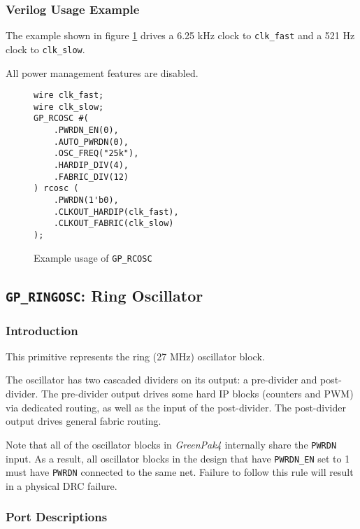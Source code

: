 \documentclass[11pt]{article}
\newcommand{\namestyle}[1]{\textit{#1}}
\newcommand{\tokenstyle}[1]{\texttt{#1}}
\newcommand{\wirestyle}[1]{\texttt{#1}}
\begin{document}
\pagebreak
\subsubsection{Verilog Usage Example}

The example shown in figure \ref{gp-rcosc-example} drives a 6.25 kHz clock to \wirestyle{clk\_fast} and a 521 Hz clock to
\wirestyle{clk\_slow}.

All power management features are disabled.

\begin{figure}[h]
\begin{lstlisting}
wire clk_fast;
wire clk_slow;
GP_RCOSC #(
	.PWRDN_EN(0),
	.AUTO_PWRDN(0),
	.OSC_FREQ("25k"),
	.HARDIP_DIV(4),
	.FABRIC_DIV(12)
) rcosc (
	.PWRDN(1'b0),
	.CLKOUT_HARDIP(clk_fast),
	.CLKOUT_FABRIC(clk_slow)
);
\end{lstlisting}
\caption{Example usage of \tokenstyle{GP\_RCOSC}}
\label{gp-rcosc-example}
\end{figure}


\pagebreak
\subsection{\tokenstyle{GP\_RINGOSC}: Ring Oscillator}
\label{gp-ringosc}

\subsubsection{Introduction}
This primitive represents the ring (27 MHz) oscillator block.

The oscillator has two cascaded dividers on its output: a pre-divider and post-divider. The pre-divider output drives
some hard IP blocks (counters and PWM) via dedicated routing, as well as the input of the post-divider. The
post-divider output drives general fabric routing.

Note that all of the oscillator blocks in \namestyle{GreenPak4} internally share the \tokenstyle{PWRDN} input. As a result, all oscillator
blocks in the design that have \tokenstyle{PWRDN\_EN} set to 1 must have \tokenstyle{PWRDN} connected to the same net. Failure to follow this
rule will result in a physical DRC failure.

\subsubsection{Port Descriptions}
\end{document}
